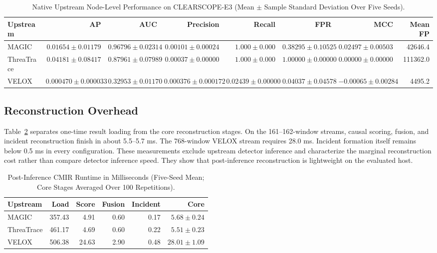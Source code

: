 \documentclass[lettersize,journal]{IEEEtran}
\begin{document}
\begin{table}[!t]
\caption{Native Upstream Node-Level Performance on CLEARSCOPE-E3 (Mean $\pm$
Sample Standard Deviation Over Five Seeds).}
\label{tab:externaldetectors}
\centering
\footnotesize
\setlength{\tabcolsep}{3.7pt}
\begin{tabular}{lrrrrrrr}
\toprule
Upstream & AP & AUC & Precision & Recall & FPR & MCC & Mean FP\\
\midrule
MAGIC & $0.01654\pm0.01179$ & $0.96796\pm0.02314$ & $0.00101\pm0.00024$ & $1.000\pm0.000$ & $0.38295\pm0.10525$ & $0.02497\pm0.00503$ & 42646.4\\
ThreaTrace & $0.04181\pm0.08417$ & $0.87961\pm0.07989$ & $0.00037\pm0.00000$ & $1.000\pm0.000$ & $1.00000\pm0.00000$ & $0.00000\pm0.00000$ & 111362.0\\
VELOX & $0.000470\pm0.000033$ & $0.32953\pm0.01170$ & $0.000376\pm0.000172$ & $0.02439\pm0.00000$ & $0.04037\pm0.04578$ & $-0.00065\pm0.00284$ & 4495.2\\
\bottomrule
\end{tabular}
\end{table}

\subsection{Reconstruction Overhead}

Table~\ref{tab:runtime} separates one-time result loading from the core
reconstruction stages.  On the 161--162-window streams, causal scoring, fusion,
and incident reconstruction finish in about 5.5--5.7 ms.  The 768-window VELOX
stream requires 28.0 ms.  Incident formation itself remains below 0.5 ms in
every configuration.  These measurements exclude upstream detector inference
and characterize the marginal reconstruction cost rather than compare detector
inference speed.  They show that post-inference reconstruction is lightweight
on the evaluated host.

\begin{table}[!t]
\caption{Post-Inference CMIR Runtime in Milliseconds (Five-Seed Mean; Core
Stages Averaged Over 100 Repetitions).}
\label{tab:runtime}
\centering
\footnotesize
\setlength{\tabcolsep}{3.0pt}
\begin{tabular}{lrrrrr}
\toprule
Upstream & Load & Score & Fusion & Incident & Core\\
\midrule
MAGIC      & 357.43 & 4.91 & 0.60 & 0.17 & $5.68\pm0.24$\\
ThreaTrace & 461.17 & 4.69 & 0.60 & 0.22 & $5.51\pm0.23$\\
VELOX      & 506.38 & 24.63 & 2.90 & 0.48 & $28.01\pm1.09$\\
\bottomrule
\end{tabular}
\end{table}
\end{document}
